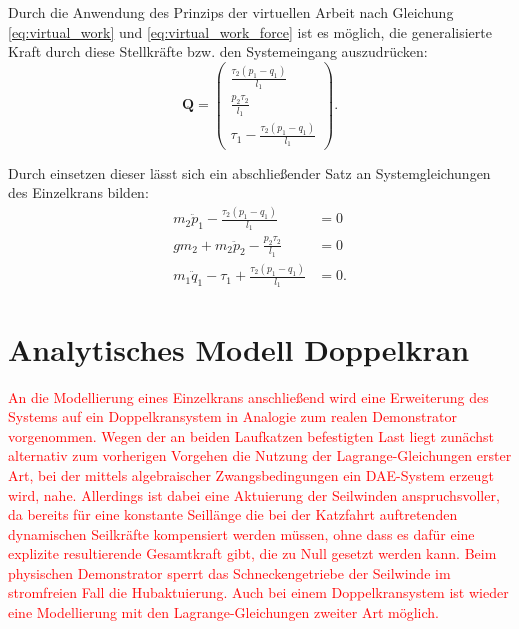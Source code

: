 Durch die Anwendung des Prinzips der virtuellen Arbeit nach Gleichung \eqref{eq:virtual_work} und \eqref{eq:virtual_work_force} ist es möglich, die generalisierte Kraft durch diese Stellkräfte bzw. den Systemeingang auszudrücken:
\begin{equation}
	\mathbf{Q}=
	\left(\begin{matrix}
		\frac{\tau_{2} \left(p_{1} - q_{1}\right)}{l_{1}}\\
		\frac{p_{2} \tau_{2}}{l_{1}}\\
		\tau_{1} - \frac{\tau_{2} \left(p_{1} - q_{1}\right)}{l_{1}}
	\end{matrix}\right).
\end{equation}

Durch einsetzen dieser lässt sich ein abschließender Satz an Systemgleichungen des Einzelkrans bilden:
\begin{subequations}
	\begin{align}
		m_{2} \ddot{p}_{1} - \frac{\tau_{2} \left(p_{1} - q_{1}\right)}{l_{1}} &= 0 \label{single_flat_syseq1}\\
		g m_{2} + m_{2} \ddot{p}_{2} - \frac{p_{2} \tau_{2}}{l_{1}} &= 0\label{single_flat_syseq2}\\
		m_{1} \ddot{q}_{1} - \tau_{1} + \frac{\tau_{2} \left(p_{1} - q_{1}\right)}{l_{1}} &= 0\label{single_flat_syseq3}.
	\end{align}
\end{subequations}


\section{Analytisches Modell Doppelkran}
\textcolor{red}{An die Modellierung eines Einzelkrans anschließend wird eine Erweiterung des Systems auf ein Doppelkransystem in Analogie zum realen Demonstrator vorgenommen. Wegen der an beiden Laufkatzen befestigten Last liegt zunächst alternativ zum vorherigen Vorgehen die Nutzung der Lagrange-Gleichungen erster Art, bei der mittels algebraischer Zwangsbedingungen ein DAE-System erzeugt wird, nahe. Allerdings ist dabei eine Aktuierung der Seilwinden anspruchsvoller, da bereits für eine konstante Seillänge die bei der Katzfahrt auftretenden dynamischen Seilkräfte kompensiert werden müssen, ohne dass es dafür eine explizite resultierende Gesamtkraft gibt, die zu Null gesetzt werden kann. Beim physischen Demonstrator sperrt das Schneckengetriebe der Seilwinde im stromfreien Fall die Hubaktuierung. Auch bei einem Doppelkransystem ist wieder eine Modellierung mit den Lagrange-Gleichungen zweiter Art möglich.}

